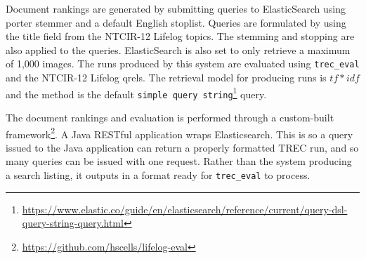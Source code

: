 Document rankings are generated by submitting queries to ElasticSearch using porter stemmer and a default English stoplist. Queries are formulated by using the title field from the NTCIR-12 Lifelog topics. The stemming and stopping are also applied to the queries. ElasticSearch is also set to only retrieve a maximum of 1,000 images. The runs produced by this system are evaluated using \verb|trec_eval| and the NTCIR-12 Lifelog qrels. The retrieval model for producing runs is $tf*idf$ and the method is the default \verb|simple query string|\footnote{\url{https://www.elastic.co/guide/en/elasticsearch/reference/current/query-dsl-query-string-query.html}} query.

The document rankings and evaluation is performed through a custom-built framework\footnote{\url{https://github.com/hscells/lifelog-eval}}. A Java RESTful application wraps Elasticsearch. This is so a query issued to the Java application can return a properly formatted TREC run, and so many queries can be issued with one request. Rather than the system producing a search listing, it outputs in a format ready for \verb|trec_eval| to process.
